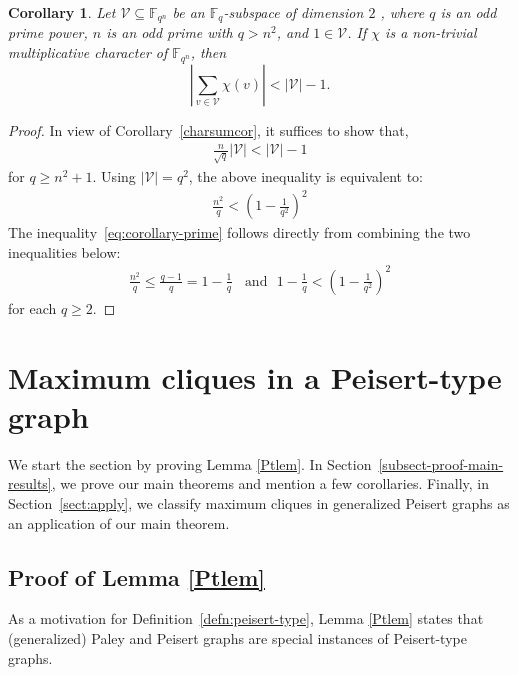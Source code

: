 \documentclass[12pt,reqno]{amsart}
\newtheorem{cor}[thm]{Corollary}
\theoremstyle{definition}
\begin{document}
\begin{cor} \label{prime}
Let $\mathcal{V} \subseteq \mathbb{F}_{q^{n}}$ be an $\mathbb{F}_{q}$-subspace of dimension $2$ , where $q$ is an odd prime power, $n$ is an odd prime with $q>n^2$, and $1 \in \mathcal{V}$.  If $\chi$ is a non-trivial multiplicative character of $\mathbb{F}_{q^{n}}$, then 
\begin{equation} \label{summ}
\left|\sum_{v \in \mathcal{V}} \chi(v)\right|<|\mathcal{V}|-1.    
\end{equation}
\end{cor} 
\begin{proof}
In view of Corollary~\ref{charsumcor}, it suffices to show that,
\begin{align*}
\frac{n}{\sqrt{q}} |\mathcal{V}| < |\mathcal{V}|-1 
\end{align*}
for $q\geq n^2+1$. Using $|\mathcal{V}|=q^2$, the above inequality is equivalent to:
\begin{align}\label{eq:corollary-prime}
\frac{n^2}{q} < \left(1-\frac{1}{q^2}\right)^2
\end{align}
The inequality~\eqref{eq:corollary-prime} follows directly from combining the two inequalities below:
\begin{align*}
    \frac{n^2}{q}\leq\frac{q-1}{q}=1-\frac{1}{q}   \ \ \ \ \text{and}  \ \ \ 1-\frac{1}{q}<\left(1-\frac{1}{q^2}\right)^2
\end{align*}
for each $q\geq 2$. \end{proof}

\section{Maximum cliques in a Peisert-type graph}\label{sect:main-proofs}

We start the section by proving Lemma \ref{Ptlem}. In Section~\ref{subsect-proof-main-results}, we prove our main theorems and mention a few corollaries. Finally, in Section~\ref{sect:apply}, we classify maximum cliques in generalized Peisert graphs as an application of our main theorem. 

\subsection{Proof of Lemma \ref{Ptlem}}\label{subsect:proof-of-Ptlem}
As a motivation for Definition~\ref{defn:peisert-type}, Lemma \ref{Ptlem} states that (generalized) Paley and Peisert graphs are special instances of Peisert-type graphs. 
\end{document}
